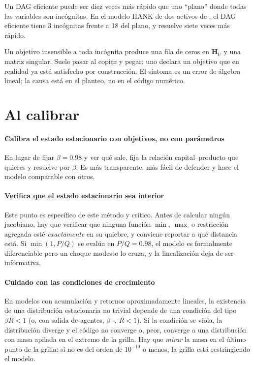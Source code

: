 Un DAG eficiente puede ser diez veces más rápido que uno ``plano'' donde todas
las variables son incógnitas. En el modelo HANK de dos activos de \abrs, el DAG
eficiente tiene 3 incógnitas frente a 18 del plano, y resuelve siete veces más
rápido.

\begin{trampa}
Un objetivo insensible a toda incógnita produce una fila de ceros en
$\mathbf{H}_U$ y una matriz singular. Suele pasar al copiar y pegar: uno declara
un objetivo que en realidad ya está satisfecho por construcción. El síntoma es un
error de álgebra lineal; la causa está en el planteo, no en el código numérico.
\end{trampa}

\section{Al calibrar}

\paragraph{Calibra el estado estacionario con objetivos, no con parámetros} En
lugar de fijar $\beta=0.98$ y ver qué sale, fija la relación
capital--producto que quieres y resuelve por $\beta$. Es más transparente, más
fácil de defender y hace el modelo comparable con otros.

\paragraph{Verifica que el estado estacionario sea interior} Este punto es
específico de este método y crítico. Antes de calcular ningún jacobiano, hay que
verificar que ninguna función $\min$, $\max$ o restricción agregada esté
\emph{exactamente} en su quiebre, y conviene reportar a qué distancia está. Si
$\min(1, P/Q)$ se evalúa en $P/Q = 0.98$, el modelo es formalmente diferenciable
pero un choque modesto lo cruza, y la linealización deja de ser informativa.

\paragraph{Cuidado con las condiciones de crecimiento} En modelos con acumulación
y retornos aproximadamente lineales, la existencia de una distribución
estacionaria no trivial depende de una condición del tipo $\beta R < 1$ (o, con
salida de agentes, $\beta\,\varsigma\,R<1$). Si la condición se viola, la
distribución diverge y el código no converge o, peor, converge a una distribución
con masa apilada en el extremo de la grilla. Hay que \emph{mirar} la masa en el
último punto de la grilla: si no es del orden de $10^{-10}$ o menos, la grilla
está restringiendo el modelo.

